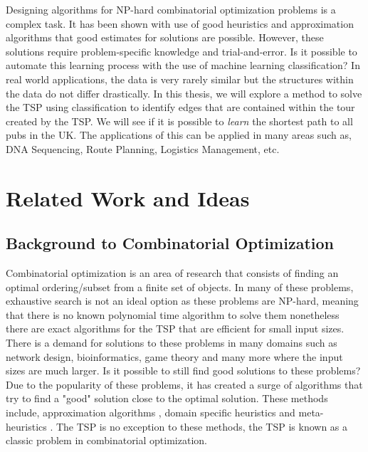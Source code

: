 \documentclass[]{UCD_CS_FYP_Report}
\begin{document}
Designing algorithms for NP-hard combinatorial optimization problems is a complex task. It has been shown with use of good heuristics and approximation algorithms that good estimates for solutions are possible. However, these solutions require problem-specific knowledge and trial-and-error. Is it possible to automate this learning process with the use of machine learning classification? In real world applications, the data is very rarely similar but the structures within the data do not differ drastically. In this thesis, we will explore a method to solve the TSP using classification to identify edges that are contained within the tour created by the TSP. We will see if it is possible to \emph{learn} the shortest path to all pubs in the UK. The applications of this can be applied in many areas such as, DNA Sequencing, Route Planning, Logistics Management, etc.

\chapter{Related Work and Ideas}
\section{Background to Combinatorial Optimization}
Combinatorial optimization is an area of research that consists of finding an optimal ordering/subset from a finite set of objects. In many of these problems, exhaustive search is not an ideal option as these problems are NP-hard, meaning that there is no known polynomial time algorithm to solve them nonetheless there are exact algorithms \cite{Bellman:1962:DPT:321105.321111} for the TSP that are efficient for small input sizes. There is a demand for solutions to these problems in many domains such as network design, bioinformatics, game theory and many more \cite{combApplications} where the input sizes are much larger. Is it possible to still find good solutions to these problems? Due to the popularity of these problems, it has created a surge of algorithms that try to find a "good" solution close to the optimal solution. These methods include, approximation algorithms \cite{JohnMcGe97}, domain specific heuristics\cite{davidapplegate2007} and meta-heuristics \cite{Larranaga1999, NatureBasedHeuristics}. The TSP is no exception to these methods, the TSP is known as a classic problem in combinatorial optimization. 
\end{document}
